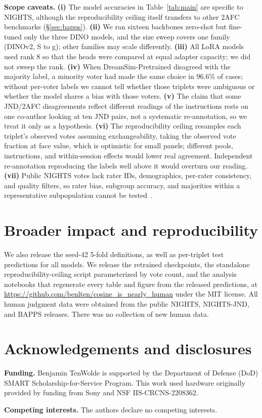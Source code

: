 \documentclass{article}
\begin{document}
\textbf{Scope caveats.} \textbf{(i)} The model accuracies in Table~\ref{tab:main} are specific to NIGHTS, although the reproducibility ceiling itself transfers to other 2AFC benchmarks (\S\ref{sec:bapps}). \textbf{(ii)} We ran sixteen backbones zero-shot but fine-tuned only the three DINO models, and the size sweep covers one family (DINOv2, S to g); other families may scale differently. \textbf{(iii)} All LoRA models used rank 8 so that the heads were compared at equal adapter capacity; we did not sweep the rank. \textbf{(iv)} When DreamSim-Pretrained disagreed with the majority label, a minority voter had made the same choice in 96.6\% of cases; without per-voter labels we cannot tell whether those triplets were ambiguous or whether the model shares a bias with those voters. \textbf{(v)} The claim that some JND/2AFC disagreements reflect different readings of the instructions rests on one co-author looking at ten JND pairs, not a systematic re-annotation, so we treat it only as a hypothesis. \textbf{(vi)} The reproducibility ceiling resamples each triplet's observed votes assuming exchangeability, taking the observed vote fraction at face value, which is optimistic for small panels; different pools, instructions, and within-session effects would lower real agreement. Independent re-annotation reproducing the labels well above it would overturn our reading. \textbf{(vii)} Public NIGHTS votes lack rater IDs, demographics, per-rater consistency, and quality filters, so rater bias, subgroup accuracy, and majorities within a representative subpopulation cannot be tested~\citep{henrich2010weirdest}.

\section*{Broader impact and reproducibility}

We also release the seed-42 5-fold definitions, as well as  per-triplet test predictions for all models.  We release the retrained checkpoints, the standalone reproducibility-ceiling script parameterized by vote count, and the analysis notebooks that regenerate every table and figure from the released predictions, at \url{https://github.com/benlten/cosine_is_nearly_human} under the MIT license. All human judgment data were obtained from the public NIGHTS, NIGHTS-JND, and BAPPS releases.  There was no collection of new human data.

\section*{Acknowledgements and disclosures}

\textbf{Funding.} Benjamin TenWolde is supported by the Department of Defense (DoD) SMART Scholarship-for-Service Program. This work used hardware originally provided by funding from Sony and NSF IIS-CRCNS-2208362.

\textbf{Competing interests.} The authors declare no competing interests.







\end{document}
